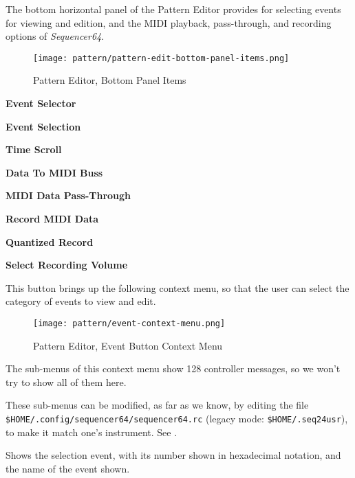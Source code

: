    The bottom horizontal panel of the Pattern Editor provides for
   selecting events for viewing and edition, and the MIDI playback,
   pass-through, and recording options of \textsl{Sequencer64}.

\begin{figure}[H]
   \centering 
   \texttt{[image: pattern/pattern-edit-bottom-panel-items.png]}
   \caption{Pattern Editor, Bottom Panel Items}
   \label{fig:pattern_editor_bottom_panel_items}
\end{figure}

   \begin{enumber}
      \item \textbf{Event Selector}
      \item \textbf{Event Selection}
      \item \textbf{Time Scroll}
      \item \textbf{Data To MIDI Buss}
      \item \textbf{MIDI Data Pass-Through}
      \item \textbf{Record MIDI Data}
      \item \textbf{Quantized Record}
      \item \textbf{Select Recording Volume}
   \end{enumber}

   \setcounter{ItemCounter}{0}      %

   This button brings up the following context menu, so that the user can
   select the category of events to view and edit.

\begin{figure}[H]
   \centering 
   \texttt{[image: pattern/event-context-menu.png]}
   \caption{Pattern Editor, Event Button Context Menu}
   \label{fig:pattern_editor_bottom_event_context_menu}
\end{figure}

   The sub-menus of this context menu show 128 controller messages,
   so we won't try to show all of them here.

   These sub-menus can be modified, as far as we know, by editing
   the file \texttt{\$HOME/.config/sequencer64/sequencer64.rc}
   (legacy mode: \texttt{\$HOME/.seq24usr}), to make it match one's
   instrument.  See .

   Shows the selection event, with its number shown in hexadecimal notation,
   and the name of the event shown.

